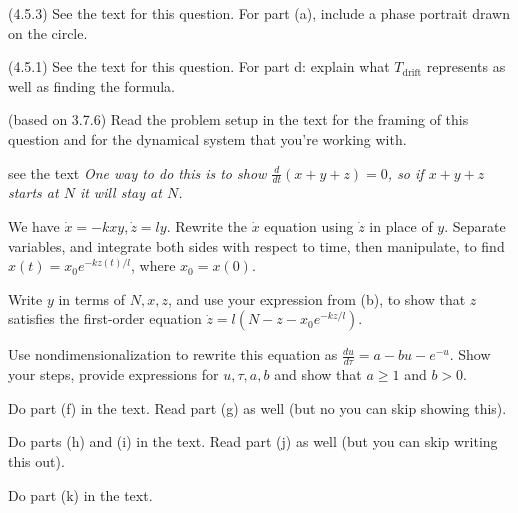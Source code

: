 \documentclass[12pt,letterpaper,noanswers]{exam}
\begin{document}
\begin{questions}
\question (4.5.3)  See the text for this question.  For part (a), include a phase portrait drawn on the circle. 

\question (4.5.1) See the text for this question.  For part d: explain what $T_{\text{drift}}$ represents as well as finding the formula.

\question (based on 3.7.6) Read the problem setup in the text for the framing of this question and for the dynamical system that you're working with.
\begin{parts}
\item see the text \emph{One way to do this is to show $\frac{d}{dt}(x+y+z) = 0$, so if $x+y+z$ starts at $N$ it will stay at $N$.}
\item We have $\dot x = -k x y, \dot z = l y$.  Rewrite the $\dot x$ equation using $\dot z$ in place of $y$.  Separate variables, and integrate both sides with respect to time, then manipulate, to find $x(t) = x_0 e^{-kz(t)/l}$, where $x_0 = x(0)$.
\item Write $y$ in terms of $N,x,z$, and use your expression from (b), to show that $z$ satisfies the first-order equation $\dot z = l(N-z-x_0e^{-kz/l})$.
\item Use nondimensionalization to rewrite this equation as $\frac{du}{d\tau} = a - bu - e^{-u}$.  Show your steps, provide expressions for $u,\tau,a,b$ and show that $a\geq 1$ and $b> 0$.
\item Do part (f) in the text.  Read part (g) as well (but no you can skip showing this).
\item Do parts (h) and (i) in the text.  Read part (j) as well (but you can skip writing this out).
\item Do part (k) in the text.
\end{parts}


\end{questions}
\end{document}
